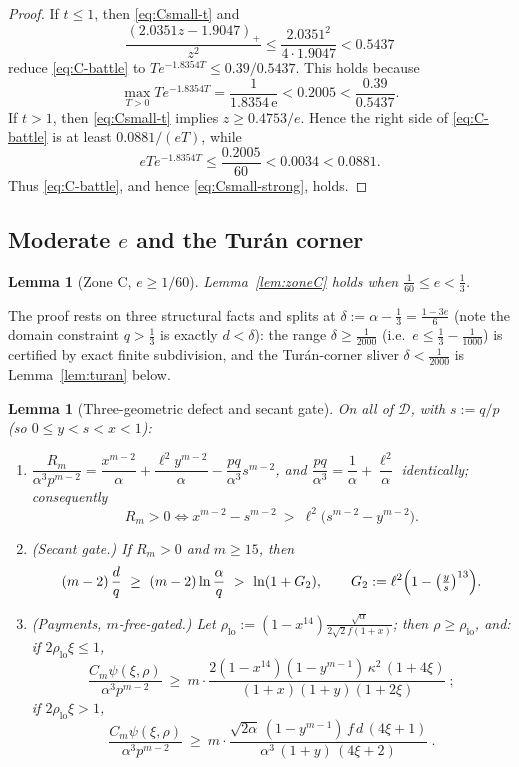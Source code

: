 \documentclass[11pt]{article}
\newtheorem{lemma}[theorem]{Lemma}
\begin{document}
\begin{proof}
If $t\le1$, then \eqref{eq:Csmall-t} and
\[
 \frac{(2.0351z-1.9047)_+}{z^2}
 \le\frac{2.0351^2}{4\cdot1.9047}<0.5437
\]
reduce \eqref{eq:C-battle} to
$Te^{-1.8354T}\le0.39/0.5437$.  This holds because
\[
        \max_{T>0}Te^{-1.8354T}
        =\frac1{1.8354\,\mathrm e}<0.2005<\frac{0.39}{0.5437}.
\]
If $t>1$, then \eqref{eq:Csmall-t} implies
$z\ge0.4753/e$.  Hence the right side of \eqref{eq:C-battle} is at least
$0.0881/(eT)$, while
\[
 eT e^{-1.8354T}\le\frac{0.2005}{60}<0.0034<0.0881.
\]
Thus \eqref{eq:C-battle}, and hence \eqref{eq:Csmall-strong}, holds.
\end{proof}


\subsection{Moderate \texorpdfstring{$e$}{e} and the Tur\'an corner}\label{subsec:zoneC-mod}

\begin{lemma}[Zone C, $e\ge1/60$]\label{lem:zoneC-mod}
Lemma~\ref{lem:zoneC} holds when $\tfrac1{60}\le e<\tfrac13$.
\end{lemma}

The proof rests on three structural facts and splits at
$\delta:=\alpha-\tfrac13=\tfrac{1-3e}6$ (note the domain constraint $q>\tfrac13$
is exactly $d<\delta$): the range $\delta\ge\tfrac1{2000}$ (i.e.\
$e\le\tfrac13-\tfrac1{1000}$) is certified by exact finite subdivision, and the
Tur\'an-corner sliver $\delta<\tfrac1{2000}$ is Lemma~\ref{lem:turan} below.

\begin{lemma}[Three-geometric defect and secant gate]\label{lem:threegeo}
On all of $\mathcal D$, with $s:=q/p$ (so $0\le y<s<x<1$):
\begin{enumerate}[label=\textup{(\roman*)}]
\item $\dfrac{R_m}{\alpha^3p^{m-2}}
=\dfrac{x^{m-2}}\alpha+\dfrac{\ell^2y^{m-2}}\alpha-\dfrac{pq}{\alpha^3}s^{m-2}$,
and $\dfrac{pq}{\alpha^3}=\dfrac1\alpha+\dfrac{\ell^2}\alpha$ identically;
consequently
\[
        R_m>0
        \iff
        x^{m-2}-s^{m-2}\ >\ \ell^2\bigl(s^{m-2}-y^{m-2}\bigr).
\]
\item (Secant gate.)  If $R_m>0$ and $m\ge15$, then
\[
        (m-2)\,\frac dq\ \ge\ (m-2)\ln\frac\alpha q\ >\ \ln(1+G_2),
        \qquad
        G_2:=\ell^2\Bigl(1-\bigl(\tfrac ys\bigr)^{13}\Bigr).
\]
\item (Payments, $m$-free-gated.)  Let
$\rho_{\mathrm{lo}}:=(1-x^{14})\frac{\sqrt\alpha}{2\sqrt2f(1+x)}$; then
$\rho\ge\rho_{\mathrm{lo}}$, and:
if $2\rho_{\mathrm{lo}}\xi\le1$,
\[
        \frac{C_m\psi(\xi,\rho)}{\alpha^3p^{m-2}}
        \ \ge\ m\cdot
        \frac{2(1-x^{14})(1-y^{m-1})\,\kappa^2\,(1+4\xi)}
        {(1+x)(1+y)(1+2\xi)}\ ;
\]
if $2\rho_{\mathrm{lo}}\xi>1$,
\[
        \frac{C_m\psi(\xi,\rho)}{\alpha^3p^{m-2}}
        \ \ge\ m\cdot
        \frac{\sqrt{2\alpha}\,(1-y^{m-1})\,f\,d\,(4\xi+1)}
        {\alpha^3\,(1+y)\,(4\xi+2)}\ .
\]
\end{enumerate}
\end{lemma}
\end{document}
